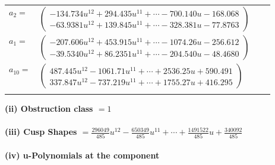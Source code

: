 \documentclass[1p]{elsarticle_modified}
\theoremstyle{definition}
\begin{document}
\begin{tabular}{m{7pt} m{180pt} m{7pt} m{180pt} }
\flushright $a_{2}=$&$\begin{pmatrix}-134.734 u^{12}+294.435 u^{11}+\cdots-700.140 u-168.068\\-63.9381 u^{12}+139.845 u^{11}+\cdots-328.381 u-77.8763\end{pmatrix}$ \\
\flushright $a_{1}=$&$\begin{pmatrix}-207.606 u^{12}+453.915 u^{11}+\cdots-1074.26 u-256.612\\-39.5340 u^{12}+86.2351 u^{11}+\cdots-204.540 u-48.4680\end{pmatrix}$ \\
\flushright $a_{10}=$&$\begin{pmatrix}487.445 u^{12}-1061.71 u^{11}+\cdots+2536.25 u+590.491\\337.847 u^{12}-737.219 u^{11}+\cdots+1755.27 u+416.295\end{pmatrix}$\\&\end{tabular}
\flushleft \textbf{(ii) Obstruction class $= 1$}\\~\\
\flushleft \textbf{(iii) Cusp Shapes $= \frac{296049}{485} u^{12}-\frac{650349}{485} u^{11}+\cdots+\frac{1491522}{485} u+\frac{340092}{485}$}\\~\\
\newpage\renewcommand{\arraystretch}{1}
\flushleft \textbf{(iv) u-Polynomials at the component}\newline \\
\end{document}
